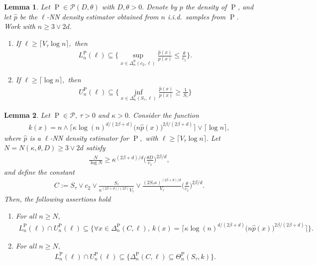 \documentclass[10pt,a4paper]{amsart}
\newtheorem{lemma}{Lemma}
\renewcommand{\P}{\operatorname{P}}
\renewcommand{\k}{\kappa}
\newcommand{\mP}{\mathcal{P}}
\newcommand{\wh}{\widehat}
\begin{document}
\begin{lemma}
    \label{lem.density.ratio}
    Let $\P \in \mP(D, \theta)$ with $D, \theta > 0.$ Denote by $p$ the density of $\P$, and let $\wh p$ be the $\ell$-NN density estimator obtained from $n$ i.i.d.\ samples from $\P.$ Work with $n \geq 3\vee 2d.$
    \begin{enumerate}
        \item [$(i)$] If $\ell \geq \lceil V_\tau\log n\rceil,$ then
        \begin{align*}
            L_n^{\P}(\ell) \subseteq \Bigg\{\sup_{x \in \Delta_n^{\P}(c_2, \ell)} \frac{\wh p(x)}{p(x)} \leq \frac{\theta}{c_1}\Bigg\}.
        \end{align*}
        \item [$(ii)$] If $\ell \geq \lceil \log n \rceil,$ then
        \begin{align*}
            U_n^{\P}(\ell) \subseteq \Bigg\{\inf_{x \in \Delta_n^{\P}(S_\tau, \ell)} \frac{\wh p(x)}{p(x)} \geq \frac{1}{S_\tau}\Bigg\}
        \end{align*}
    \end{enumerate}
\end{lemma}

\begin{lemma}
    \label{lem.inclusions}
    Let $\P \in \mP,\ \tau > 0$ and $\k > 0.$ Consider the function
    \begin{align*}
        k(x) = n \wedge \Big\lceil\k\log(n)^{d/(2\beta + d)}\big(n\wh p(x)\big)^{2\beta/(2\beta + d)} \Big\rceil \vee \lceil \log n\rceil, 
    \end{align*}
    where $\wh p$ is a $\ell$-NN density estimator for $\P,$ with $\ell \geq \lceil V_\tau\log n\rceil.$ Let $N = N(\k, \theta, D) \geq 3\vee 2d$ satisfy
    \begin{align*}
        \frac N{\log N} \geq \k^{(2\beta + d)/d}\bigg(\frac{\theta D}{c_1}\bigg)^{2\beta/d},
    \end{align*}
    and define the constant
    \begin{align*}
        C := S_\tau\vee c_2 \vee \frac{S_\tau}{\k^{(2\beta + d)/(2\beta)}V_\tau} \vee \frac{(2S_\tau\k)^{(2\beta + d)/d}}{V_\tau}\bigg(\frac{\theta}{c_1}\bigg)^{2\beta/d}.
    \end{align*}
    Then, the following assertions hold
    \begin{enumerate}
        \item [$(i)$] For all $n \geq N,$ 
            \begin{align*}
                L_n^{\P}(\ell)\cap U_n^{\P}(\ell) \subseteq \Bigg\{\forall x \in \Delta_n^{\P}(C, \ell), \ k(x) = \Big\lceil\k\log(n)^{d/(2\beta + d)}\big(n\wh p(x)\big)^{2\beta/(2\beta + d)}\Big\rceil\Bigg\}.
            \end{align*}
        \item [$(ii)$] For all $n \geq N,$
            \begin{align*}
                 L_n^{\P}(\ell)\cap U_n^{\P}(\ell) \subseteq \Bigg\{\Delta_n^{\P}(C, \ell) \subseteq \Theta_n^{\P}(S_\tau, k)\Bigg\}.
            \end{align*}
    \end{enumerate}
\end{lemma}
\end{document}
